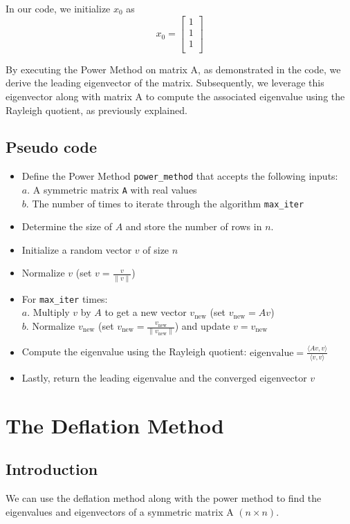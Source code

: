 \documentclass[11pt]{article}
\begin{document}
In our code, we initialize \(x_0\) as 
\[ x_{0} = 
\begin{bmatrix}
1 \\
1 \\
1 \\
\end{bmatrix}
\]

By executing the Power Method on matrix A, as demonstrated in the code, we derive the leading eigenvector of the matrix. Subsequently, we leverage this eigenvector along with matrix A to compute the associated eigenvalue using the Rayleigh quotient, as previously explained.

\subsection{Pseudo code}
\begin{itemize}
    \item Define the Power Method \texttt{power\_method} that accepts the following inputs:\\
    $a.$ A symmetric matrix \texttt{A} with real values\\
    $b.$ The number of times to iterate through the algorithm \texttt{max\_iter}
    \item Determine the size of $A$ and store the number of rows in $n$. 
    \item Initialize a random vector $v$ of size $n$
    \item Normalize $v$ (set $v = \frac{v}{\|v\|}$)
    \item For \texttt{max\_iter} times:\\
    $a.$ Multiply $v$ by $A$ to get a new vector $v_{\text{new}}$ (set $v_{\text{new}} = Av$) \\           $b.$ Normalize $v_{\text{new}}$ (set $v_{\text{new}} = \frac{v_{\text{new}}}{\|v_{\text{new}}\|}$) and update $v = v_{\text{new}}$
    \item Compute the eigenvalue using the Rayleigh quotient: $\text{eigenvalue} = \frac{\langle Av, v \rangle}{\langle v, v \rangle}$
    \item Lastly, return the leading eigenvalue and the converged eigenvector $v$
\end{itemize}

\newpage
\section{The Deflation Method}
\subsection{Introduction}
We can use the deflation method along with the power method to find the eigenvalues and eigenvectors of a symmetric matrix A $(n \times n)$. \\
\end{document}
